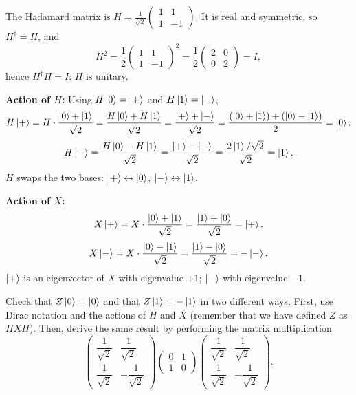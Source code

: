 \documentclass{ceri/sty/rapport}
\newcounter{exercice}[section]
\begin{document}
\begin{solution}
The Hadamard matrix is $H=\tfrac{1}{\sqrt{2}}\begin{pmatrix}1&1\\1&-1\end{pmatrix}$.
It is real and symmetric, so $H^\dagger=H$, and
\[
  H^2 = \frac{1}{2}\begin{pmatrix}1&1\\1&-1\end{pmatrix}^2
      = \frac{1}{2}\begin{pmatrix}2&0\\0&2\end{pmatrix} = I,
\]
hence $H^\dagger H = I$: $H$ is unitary.

\medskip\noindent
\textbf{Action of $H$:}
Using $H\ket{0}=\ket{+}$ and $H\ket{1}=\ket{-}$,
\[
  H\ket{+} = H\cdot\frac{\ket{0}+\ket{1}}{\sqrt{2}}
           = \frac{H\ket{0}+H\ket{1}}{\sqrt{2}}
           = \frac{\ket{+}+\ket{-}}{\sqrt{2}}
           = \frac{(\ket{0}+\ket{1})+(\ket{0}-\ket{1})}{2} = \ket{0}.
\]
\[
  H\ket{-} = \frac{H\ket{0}-H\ket{1}}{\sqrt{2}} = \frac{\ket{+}-\ket{-}}{\sqrt{2}}
           = \frac{2\ket{1}/\sqrt{2}}{\sqrt{2}} = \ket{1}.
\]
$H$ swaps the two bases: $\ket{+}\leftrightarrow\ket{0}$, $\ket{-}\leftrightarrow\ket{1}$.

\medskip\noindent
\textbf{Action of $X$:}
\[
  X\ket{+} = X\cdot\frac{\ket{0}+\ket{1}}{\sqrt{2}} = \frac{\ket{1}+\ket{0}}{\sqrt{2}} = \ket{+}.
\]
\[
  X\ket{-} = X\cdot\frac{\ket{0}-\ket{1}}{\sqrt{2}} = \frac{\ket{1}-\ket{0}}{\sqrt{2}} = -\ket{-}.
\]
$\ket{+}$ is an eigenvector of $X$ with eigenvalue $+1$; $\ket{-}$ with eigenvalue $-1$.
\end{solution}

\begin{exercice}[p.~17]
Check that $Z\ket{0} = \ket{0}$ and that $Z\ket{1} = -\ket{1}$ in two different
ways. First, use Dirac notation and the actions of $H$ and $X$ (remember that we
have defined $Z$ as $HXH$). Then, derive the same result by performing the matrix
multiplication
\[
  \begin{pmatrix}
    \dfrac{1}{\sqrt{2}} & \dfrac{1}{\sqrt{2}} \\[6pt]
    \dfrac{1}{\sqrt{2}} & -\dfrac{1}{\sqrt{2}}
  \end{pmatrix}
  \begin{pmatrix} 0 & 1 \\ 1 & 0 \end{pmatrix}
  \begin{pmatrix}
    \dfrac{1}{\sqrt{2}} & \dfrac{1}{\sqrt{2}} \\[6pt]
    \dfrac{1}{\sqrt{2}} & -\dfrac{1}{\sqrt{2}}
  \end{pmatrix}.
\]
\end{exercice}
\end{document}
